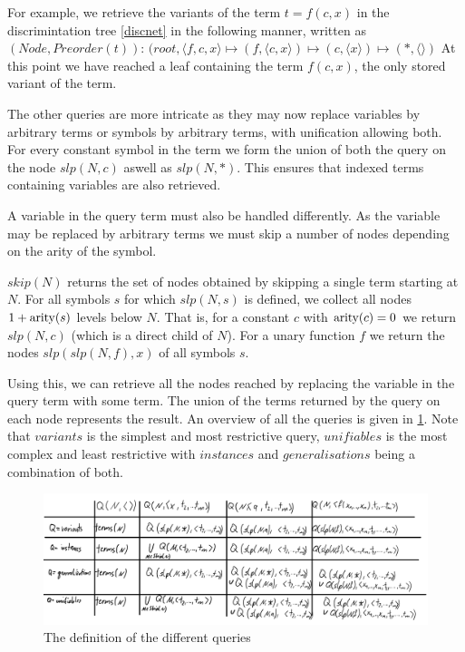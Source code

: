 For example, we retrieve the variants of the term $t = f(c,x)$ in the discrimintation tree \cref{discnet} in the following manner, written as $(Node, Preorder(t))$:
$(root, \langle f,c,x \rangle \mapsto (f, \langle c,x \rangle) \mapsto (c, \langle x \rangle) \mapsto (*,\langle  \rangle)$
At this point we have reached a leaf containing the term $f(c,x)$, the only stored variant of the term.

The other queries are more intricate as they may now replace variables by arbitrary terms or symbols by arbitrary terms, with unification allowing both. For every constant symbol in the term we form the union of both the query on the node $slp(N,c)$ aswell as $slp(N,*)$. This ensures that indexed terms containing variables are also retrieved.

A variable in the query term must also be handled differently. As the variable may be replaced by arbitrary terms we must skip a number of nodes depending on the arity of the symbol.
\begin{defn}
  $skip(N)$ returns the set of nodes obtained by skipping a single term starting at $N$. For all symbols $s$ for which $slp(N,s)$ is defined, we collect all nodes $1 + \mathrm{arity}(s)$ levels below $N$. That is, for a constant $c$ with $\mathrm{arity}(c) = 0$ we return $slp(N,c)$ (which is a direct child of $N$). For a unary function $f$ we return the nodes $slp(slp(N,f),x)$ of all symbols $s$.
\end{defn}
Using this, we can retrieve all the nodes reached by replacing the variable in the query term with some term. The union of the terms returned by the query on each node represents the result. An overview of all the queries is given in \cref{discnetqueries}. Note that $variants$ is the simplest and most restrictive query, $unifiables$ is the most complex and least restrictive with $instances$ and $generalisations$ being a combination of both.

\begin{figure}[h]
\centering
\includegraphics[scale=0.25]{figures/disc_net_queries.png}
\caption{The definition of the different queries}
\label{discnetqueries}
\end{figure}

